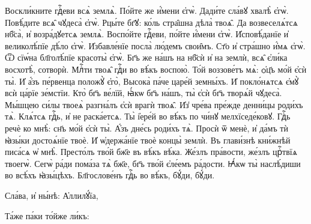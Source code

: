 \cuLettrine
Воскли́кните гдⷭ҇еви всѧ̀ землѧ̀. 
\hKv По́йте же  и҆́мени є҆гѡ̀. 
\hKv Дади́те сла́вꙋ хвалѣ̀ є҆гѡ̀. 
\hKv  Повѣ́дите всѧ̑ чꙋдеса̀ є҆гѡ̀. 
\hKv Рцы́те бг҃ꙋ: ко́ль  стра̑шна дѣла̀ твоѧ̑. 
\hKv Да возвеселѧ́тсѧ нб҃са̀, и҆  возра́дꙋетсѧ землѧ̀. 
\hKv Воспо́йте гдⷭ҇еви, по́йте и҆́мени  є҆гѡ̀. 
\hKv И҆сповѣ́данїе и҆ великолѣ́пїе дѣ́ло є҆гѡ̀.  
\hKv И҆збавле́нїе посла̀ лю́демъ свои̑мъ. 
\hKv Ст҃о и҆  стра́шно и҆́мѧ є҆гѡ̀. 
\hKv Ѿ сїѡ́на бл҃голѣ́пїе красоты̀  є҆гѡ̀. 
\hKv Бг҃ъ же на́шъ на нб҃сѝ и҆ на землѝ, всѧ̑  є҆ли́ка восхотѣ̀, сотворѝ. 
\hKv Млⷭ҇ти твоѧ̑ гдⷭ҇и во  вѣ́къ воспою̀. 
\hKv То́й воззове́тъ мѧ̀: ѻ҆ц҃ъ мо́й є҆сѝ  ты̀. 
\hKv И҆ а҆́зъ пе́рвенца положꙋ̀ є҆го̀, 
\hKv Высока̀  па́че царе́й земны́хъ.  
\hKv И҆  покло́нѧтсѧ є҆мꙋ̀ всѝ ца́рїе зе́мстїи. 
\hKv Кто̀ бг҃ъ  ве́лїй, ꙗ҆́кѡ бг҃ъ на́шъ, ты̀ є҆сѝ бг҃ъ творѧ́й чꙋдеса̀.  
\hKv Мы́шцею си́лы твоеѧ̀ разгна́лъ є҆сѝ врагѝ твоѧ̑.  
\hKv И҆з̾ чре́ва пре́жде денни́цы роди́хъ тѧ̀. 
\hKv Клѧ́тсѧ  гдⷭ҇ь, и҆ не раска́етсѧ. 
\hKv Ты̀ і҆ере́й во вѣ́къ по чи́нꙋ  мелхїседе́ковꙋ. 
\hKv Гдⷭ҇ь речѐ ко мнѣ̀: сн҃ъ мо́й є҆сѝ  ты̀. 
\hKv А҆́зъ дне́сь роди́хъ тѧ̀. 
\hKv Просѝ ѿ менѐ,  и҆ да́мъ тѝ ꙗ҆зы́ки достоѧ́нїе твоѐ. 
\hKv И҆ ѡ҆держа́нїе  твоѐ концы̀ землѝ. 
\hKv Въ глави́знѣ кни́жнѣй писа́сѧ ѡ҆  мнѣ̀. 
\hKv Престо́лъ тво́й бж҃е въ вѣ́къ вѣ́ка. 
\hKv  Же́злъ пра́вости, же́злъ црⷭ҇твїѧ твоегѡ̀. 
\hKv Сегѡ̀ ра́ди  пома́за тѧ̀ бж҃е, бг҃ъ тво́й є҆ле́емъ ра́дости. 
\hKv Ꙗ҆́кѡ  ты̀ наслѣ́диши во всѣ́хъ ꙗ҆зы́цѣхъ. 
\hKv Бл҃гослове́нъ  гдⷭ҇ь во вѣ́къ, бꙋ́ди, бꙋ́ди. 

\hKv Сла́ва, и҆ ны́нѣ: А҆ллилꙋ́їа, 



%
Та́же па́ки то́йже ли́къ: 

